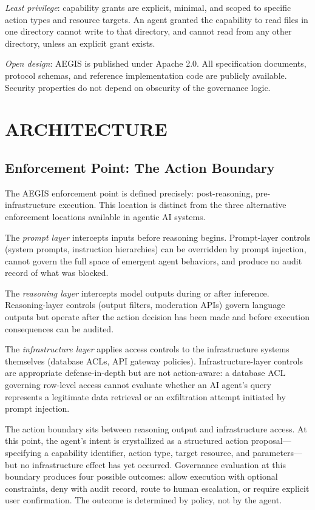 \documentclass{IEEEcsmag}
\begin{document}
{\it Least privilege}: capability grants are explicit, minimal, and scoped to specific action types and resource targets. An agent granted the capability to read files in one directory cannot write to that directory, and cannot read from any other directory, unless an explicit grant exists.

{\it Open design}: AEGIS is published under Apache 2.0. All specification documents, protocol schemas, and reference implementation code are publicly available. Security properties do not depend on obscurity of the governance logic.

\section{ARCHITECTURE}

\subsection{Enforcement Point: The Action Boundary}

The AEGIS enforcement point is defined precisely: post-reasoning, pre-infrastructure execution. This location is distinct from the three alternative enforcement locations available in agentic AI systems.

The {\it prompt layer} intercepts inputs before reasoning begins. Prompt-layer controls (system prompts, instruction hierarchies) can be overridden by prompt injection, cannot govern the full space of emergent agent behaviors, and produce no audit record of what was blocked.

The {\it reasoning layer} intercepts model outputs during or after inference. Reasoning-layer controls (output filters, moderation APIs) govern language outputs but operate after the action decision has been made and before execution consequences can be audited.

The {\it infrastructure layer} applies access controls to the infrastructure systems themselves (database ACLs, API gateway policies). Infrastructure-layer controls are appropriate defense-in-depth but are not action-aware: a database ACL governing row-level access cannot evaluate whether an AI agent's query represents a legitimate data retrieval or an exfiltration attempt initiated by prompt injection.

The action boundary sits between reasoning output and infrastructure access. At this point, the agent's intent is crystallized as a structured action proposal---specifying a capability identifier, action type, target resource, and parameters---but no infrastructure effect has yet occurred. Governance evaluation at this boundary produces four possible outcomes: allow execution with optional constraints, deny with audit record, route to human escalation, or require explicit user confirmation. The outcome is determined by policy, not by the agent.
\end{document}
